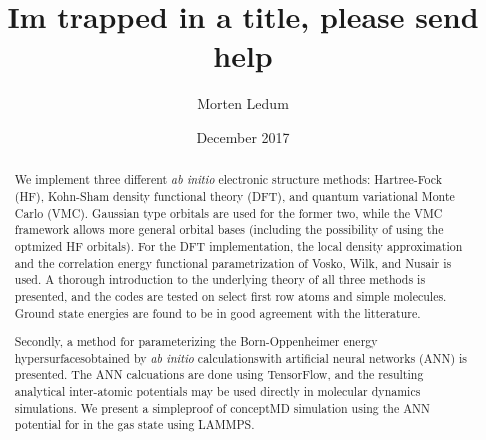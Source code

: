 \documentclass[twoside,english]{uiofysmaster}
\author{Morten Ledum}
\title{Im trapped in a title, please send help}
\date{December 2017}
\begin{document}
\newcommand{\mainfile}{}
\maketitle

\begin{abstract}
We implement three different \emph{ab initio} electronic structure methods: Hartree-Fock (HF), Kohn-Sham density functional theory (DFT), and quantum variational Monte Carlo (VMC). Gaussian type orbitals are used for the former two, while the VMC framework allows more general orbital bases (including the possibility of using the optmized HF orbitals). For the DFT implementation, the local density approximation and the correlation energy functional parametrization of Vosko, Wilk, and Nusair is used. A thorough introduction to the underlying theory of all three methods is presented, and the codes are tested on select first row atoms and simple molecules. Ground state energies are found to be in good agreement with the litterature. 

Secondly, a method for parameterizing the Born-Oppenheimer energy hypersurfaces\textemdash obtained by \emph{ab initio} calculations\textemdash with artificial neural networks (ANN) is presented. The ANN calcuations are done using TensorFlow, and the resulting analytical inter-atomic potentials may be used directly in molecular dynamics simulations. We present a simple\textemdash proof of concept\textemdash MD simulation using the ANN potential for  in the gas state using LAMMPS.
\end{abstract}


\end{document}
